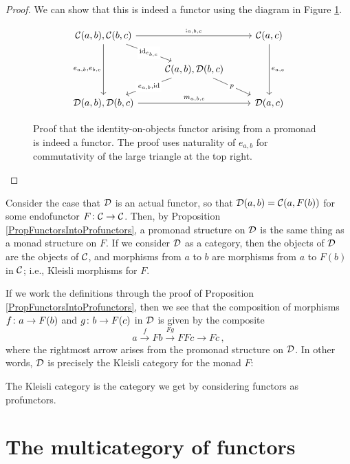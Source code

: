 \begin{proof}
  We can show that this is indeed a functor using the diagram in Figure \ref{FigPromonadFunctorProof}.
  \begin{figure}[hbt]
    \[
      \begin{tikzcd}
        \C(a,b),\C(b,c) \arrow[rr, "{;_{a,b,c}}"] \arrow[dd, "{e_{a,b},e_{b,c}}"'] \arrow[dr, "{\id_{e_{b,c}}}" description]
          &
            & \C(a,c) \arrow[dd, "{e_{a,c}}"] \\
          & \C(a,b),\D(b,c) \arrow[dl, "{e_{a,b},\id}" description] \arrow[dr, "p" description]
            & \\
        \D(a,b),\D(b,c) \arrow[rr, "{m_{a,b,c}}"]
          &
            & \D(a,c)
      \end{tikzcd}
      \]
    \caption[Promonads are identity-on-objects functors.]
    {Proof that the identity-on-objects functor arising from a promonad is indeed a functor.  
    The proof uses naturality of $e_{a,b}$ for commutativity of the large triangle at the top right.}
    \label{FigPromonadFunctorProof}
  \end{figure}
\end{proof}

Consider the case that ${\mathcal{D}}$ is an actual functor, so that ${\mathcal{D}}(a,b)={\mathcal{C}}(a,F(b))$ for some endofunctor $F\colon{\mathcal{C}}\to{\mathcal{C}}$.  
Then, by Proposition \ref{PropFunctorsIntoProfunctors}, a promonad structure on ${\mathcal{D}}$ is the same thing as a monad structure on $F$.  
If we consider ${\mathcal{D}}$ as a category, then the objects of ${\mathcal{D}}$ are the objects of ${\mathcal{C}}$, and morphisms from $a$ to $b$ are morphisms from $a$ to $F(b)$ in ${\mathcal{C}}$; i.e., Kleisli morphisms for $F$.

If we work the definitions through the proof of Proposition \ref{PropFunctorsIntoProfunctors}, then we see that the composition of morphisms $f\colon a \to F(b)$ and $g \colon b \to F(c)$ in ${\mathcal{D}}$ is given by the composite
\[
  a \xrightarrow{f}
  Fb \xrightarrow{Fg}
  FFc \to
  Fc\,,
  \]
where the rightmost arrow arises from the promonad structure on ${\mathcal{D}}$.  
In other words, ${\mathcal{D}}$ is precisely the Kleisli category for the monad $F$:

\begin{slogan}
  \label{SlogKleisli}
  The Kleisli category is the category we get by considering functors as profunctors.
\end{slogan}

\section{The multicategory of functors}

